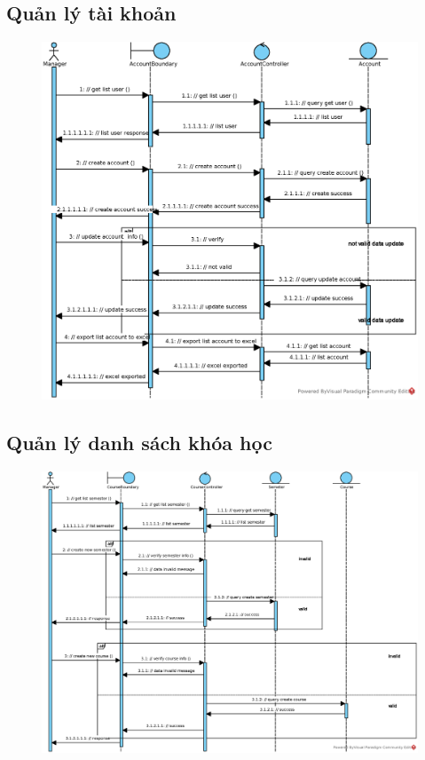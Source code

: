 \documentclass[./../main_file.tex]{subfiles}
\begin{document}
	
	\subsection{Quản lý tài khoản }
	\begin{figure}[H]
		\centering
		\includegraphics[width=\linewidth]{./images/sequence_diagram/3_16_AccountManage.eps}
	\end{figure}
	
	
	\subsection{Quản lý danh sách khóa học}
	\begin{figure}[H]
		\centering
		\includegraphics[width=\linewidth]{./images/sequence_diagram/3_17_CourseManage.eps}
	\end{figure}
	
\end{document}

